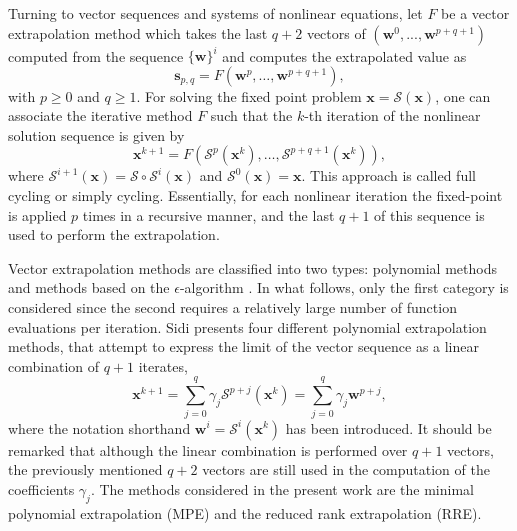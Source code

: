           Turning to vector sequences and systems of nonlinear equations, let \(F\) be a vector extrapolation method which takes the last $q+2$ vectors of $(\mathbf{w}^{0},...,\mathbf{w}^{p+q+1})$ computed from the sequence $\{\mathbf{w}\}^{i}$ and computes the extrapolated value as
          \begin{equation}
            \mathbf{s}_{p,q} = F\left(\mathbf{w}^{p}, \ldots, \mathbf{w}^{p+q+1}\right),
          \end{equation}
          with \(p\geq 0\) and \(q\geq 1\).
          For solving the fixed point problem \(\mathbf{x}=\bm{\mathcal{S}}(\mathbf{x})\), one can associate the iterative method \(F\) such that the $k$-th iteration of the nonlinear solution sequence is given by
          \begin{equation}
            \mathbf{x}^{k+1}=F\left(\bm{\mathcal{S}}^{p}(\mathbf{x}^{k}), \ldots, \bm{\mathcal{S}}^{p+q+1}(\mathbf{x}^{k})\right),
          \end{equation}
          where \(\bm{\mathcal{S}}^{i+1}(\mathbf{x})=\bm{\mathcal{S}} \circ \bm{\mathcal{S}}^{i}(\mathbf{x})\) and \(\bm{\mathcal{S}}^{0}(\mathbf{x})=\mathbf{x}\).
          This approach is called full cycling or simply cycling.
          Essentially, for each nonlinear iteration the fixed-point is applied  $p$ times in a recursive manner, and the last $q+1$ of this sequence is used to perform the extrapolation.

          Vector extrapolation methods are classified into two types: polynomial methods and methods based on the \(\epsilon\)-algorithm \citep{brezinski_extrapolation_2013, sidi_vector_2017}.
          In what follows, only the first category is considered since the second requires a relatively large number of function evaluations per iteration.
          Sidi \citep{sidi_vector_2017} presents four different polynomial extrapolation methods, that attempt to express the limit of the vector sequence as a linear combination of \(q+1\) iterates,
          \begin{equation}
            \mathbf{x}^{k+1} = \sum_{j=0}^{q} \gamma_{j} \bm{\mathcal{S}}^{p+j}(\mathbf{x}^{k})  = \sum_{j=0}^{q} \gamma_{j} \mathbf{w}^{p+j},
          \end{equation}
          where the notation shorthand $\mathbf{w}^{i} = \bm{\mathcal{S}}^{i}(\mathbf{x}^{k})$ has been introduced.
          It should be remarked that although the linear combination is performed over $q+1$ vectors, the previously mentioned $q+2$ vectors are still used in the computation of the coefficients $\gamma_{j}$.
          The methods considered in the present work are the minimal polynomial extrapolation (MPE) and the reduced rank extrapolation (RRE).

